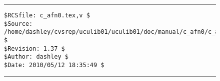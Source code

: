 \noindent\begin{figure}[!b]
\noindent\rule[-0.25in]{\textwidth}{1pt}
\begin{tiny}
\begin{verbatim}
$RCSfile: c_afn0.tex,v $
$Source: /home/dashley/cvsrep/uculib01/uculib01/doc/manual/c_afn0/c_afn0.tex,v $
$Revision: 1.37 $
$Author: dashley $
$Date: 2010/05/12 18:35:49 $
\end{verbatim}
\end{tiny}
\noindent\rule[0.25in]{\textwidth}{1pt}
\end{figure}
%
%
%
%
%
%
%
%
%
%
%
%
%
%
%
%
%
%
%
%
%
%

